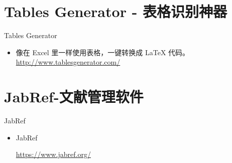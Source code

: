 \documentclass[13pt]{ctexbeamer}
\begin{document}
\section{Tables Generator - 表格识别神器 }
\begin{frame}{Tables Generator }
\begin{itemize}
	\item 	 像在 Excel 里一样使用表格，一键转换成 LaTeX 代码。 
	\href{ http://www.tablesgenerator.com/}{ http://www.tablesgenerator.com/}

\end{itemize}


\end{frame}


\section{JabRef-文献管理软件}
\begin{frame}{JabRef}
\begin{itemize}
\item  JabRef

\href{https://www.jabref.org/}{https://www.jabref.org/}
\end{itemize}
\end{frame} 
\end{document}
